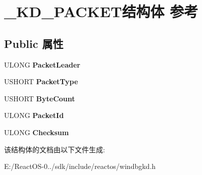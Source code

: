 \hypertarget{struct___k_d___p_a_c_k_e_t}{}\section{\+\_\+\+K\+D\+\_\+\+P\+A\+C\+K\+E\+T结构体 参考}
\label{struct___k_d___p_a_c_k_e_t}
\subsection*{Public 属性}
\begin{DoxyCompactItemize}
\item 
\mbox{\label{struct___k_d___p_a_c_k_e_t_a9d5014c2882e3454a4721d7be3f205f6}} 
U\+L\+O\+NG {\bfseries Packet\+Leader}
\item 
\mbox{\label{struct___k_d___p_a_c_k_e_t_a24980cf06e4a59b17778f980176bfb7c}} 
U\+S\+H\+O\+RT {\bfseries Packet\+Type}
\item 
\mbox{\label{struct___k_d___p_a_c_k_e_t_aa446f089f966db84a3ae5d329bd61bf3}} 
U\+S\+H\+O\+RT {\bfseries Byte\+Count}
\item 
\mbox{\label{struct___k_d___p_a_c_k_e_t_aabe79192e4965c715dccdf301bfc99b9}} 
U\+L\+O\+NG {\bfseries Packet\+Id}
\item 
\mbox{\label{struct___k_d___p_a_c_k_e_t_aeadafac31973ba2a033077ad11db2464}} 
U\+L\+O\+NG {\bfseries Checksum}
\end{DoxyCompactItemize}


该结构体的文档由以下文件生成\+:\begin{DoxyCompactItemize}
\item 
E\+:/\+React\+O\+S-\/0../sdk/include/reactos/windbgkd.\+h\end{DoxyCompactItemize}
